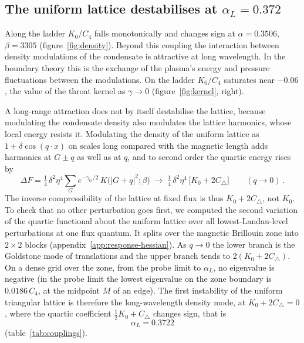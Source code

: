 \subsection{The uniform lattice destabilises at \texorpdfstring{$\alpha_L = 0.372$}{alpha\_L = 0.372}}
\label{sec:5.3}

Along the ladder $K_0/C_4$ falls monotonically and changes sign at
$\alpha = 0.3506$, $\beta = 3305$ (figure~\ref{fig:density}).
Beyond this coupling the interaction between density modulations of the
condensate is attractive at long wavelength. In the boundary theory this
is the exchange of the plasma's energy and pressure fluctuations between
the modulations. On the ladder $K_0/C_4$ saturates near $-0.06$, the value
of the throat kernel as $\gamma \to 0$ (figure~\ref{fig:kernel}, right).

A long-range attraction does not by itself destabilise the lattice, because
modulating the condensate density also modulates the lattice harmonics,
whose local energy resists it. Modulating the density of the uniform
lattice as $1 + \delta\cos(q\cdot x)$ on scales long compared with the
magnetic length adds harmonics at $G \pm q$ as well as at $q$, and to
second order the quartic energy rises by
\begin{equation}
\Delta F = \tfrac14\,\delta^2\eta^4 \sum_G e^{-\gamma_G/2}\,K\big(|G+q|^2;\beta\big)
\;\longrightarrow\; \tfrac14\,\delta^2\eta^4\,\big[K_0 + 2C_\triangle\big]
\qquad (q \to 0)~.
\end{equation}
The inverse compressibility of the lattice at fixed flux is thus
$K_0 + 2C_\triangle$, not $K_0$. To check that no other perturbation goes
first, we computed the second variation of the quartic functional about the
uniform lattice over all lowest-Landau-level perturbations at one flux
quantum. It splits over the magnetic Brillouin zone into $2\times2$ blocks
(appendix~\ref{app:response-hessian}). As $q \to 0$ the lower
branch is the Goldstone mode of translations and the upper branch tends to
$2(K_0 + 2C_\triangle)$. On a dense grid over the zone, from the probe
limit to $\alpha_L$, no eigenvalue is negative (in the probe limit the
lowest eigenvalue on the zone boundary is $0.0186\,C_4$, at the midpoint
$M$ of an edge). The
first instability of the uniform triangular lattice is therefore the
long-wavelength density mode, at $K_0 + 2C_\triangle = 0$, where the
quartic coefficient $\tfrac12K_0 + C_\triangle$ changes sign, that
is
\begin{equation}
\alpha_L = 0.3722
\end{equation}
(table~\ref{tab:couplings}).

